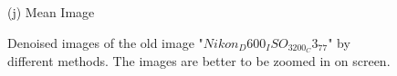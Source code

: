 \documentclass[10pt,twocolumn,letterpaper]{article}
\begin{document}
\begin{figure}
{\begin{minipage}[t]{0.2\textwidth}
{\footnotesize (j) Mean Image }
\end{minipage}
}
\caption{Denoised images of the old image "$Nikon_D600_ISO_3200_C3_77$" by different methods. The images are better to be zoomed in on screen.}
\label{fig2}
\end{figure}

\begin{figure}
\centering
{}
\end{figure}
\end{document}
